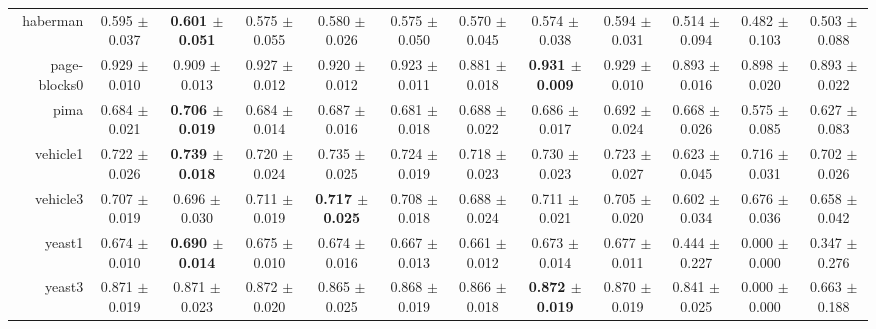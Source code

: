 \begin{table}[!ht]
{\begin{tabular}{r c c c c c c c c c c c}
haberman & 0.595 $\pm$ 0.037 & \textbf{0.601 $\pm$ 0.051} & 0.575 $\pm$ 0.055 & 0.580 $\pm$ 0.026 & 0.575 $\pm$ 0.050 & 0.570 $\pm$ 0.045 & 0.574 $\pm$ 0.038 & 0.594 $\pm$ 0.031 & 0.514 $\pm$ 0.094 & 0.482 $\pm$ 0.103 & 0.503 $\pm$ 0.088 \\
page-blocks0 & 0.929 $\pm$ 0.010 & 0.909 $\pm$ 0.013 & 0.927 $\pm$ 0.012 & 0.920 $\pm$ 0.012 & 0.923 $\pm$ 0.011 & 0.881 $\pm$ 0.018 & \textbf{0.931 $\pm$ 0.009} & 0.929 $\pm$ 0.010 & 0.893 $\pm$ 0.016 & 0.898 $\pm$ 0.020 & 0.893 $\pm$ 0.022 \\
pima & 0.684 $\pm$ 0.021 & \textbf{0.706 $\pm$ 0.019} & 0.684 $\pm$ 0.014 & 0.687 $\pm$ 0.016 & 0.681 $\pm$ 0.018 & 0.688 $\pm$ 0.022 & 0.686 $\pm$ 0.017 & 0.692 $\pm$ 0.024 & 0.668 $\pm$ 0.026 & 0.575 $\pm$ 0.085 & 0.627 $\pm$ 0.083 \\
vehicle1 & 0.722 $\pm$ 0.026 & \textbf{0.739 $\pm$ 0.018} & 0.720 $\pm$ 0.024 & 0.735 $\pm$ 0.025 & 0.724 $\pm$ 0.019 & 0.718 $\pm$ 0.023 & 0.730 $\pm$ 0.023 & 0.723 $\pm$ 0.027 & 0.623 $\pm$ 0.045 & 0.716 $\pm$ 0.031 & 0.702 $\pm$ 0.026 \\
vehicle3 & 0.707 $\pm$ 0.019 & 0.696 $\pm$ 0.030 & 0.711 $\pm$ 0.019 & \textbf{0.717 $\pm$ 0.025} & 0.708 $\pm$ 0.018 & 0.688 $\pm$ 0.024 & 0.711 $\pm$ 0.021 & 0.705 $\pm$ 0.020 & 0.602 $\pm$ 0.034 & 0.676 $\pm$ 0.036 & 0.658 $\pm$ 0.042 \\
yeast1 & 0.674 $\pm$ 0.010 & \textbf{0.690 $\pm$ 0.014} & 0.675 $\pm$ 0.010 & 0.674 $\pm$ 0.016 & 0.667 $\pm$ 0.013 & 0.661 $\pm$ 0.012 & 0.673 $\pm$ 0.014 & 0.677 $\pm$ 0.011 & 0.444 $\pm$ 0.227 & 0.000 $\pm$ 0.000 & 0.347 $\pm$ 0.276 \\
yeast3 & 0.871 $\pm$ 0.019 & 0.871 $\pm$ 0.023 & 0.872 $\pm$ 0.020 & 0.865 $\pm$ 0.025 & 0.868 $\pm$ 0.019 & 0.866 $\pm$ 0.018 & \textbf{0.872 $\pm$ 0.019} & 0.870 $\pm$ 0.019 & 0.841 $\pm$ 0.025 & 0.000 $\pm$ 0.000 & 0.663 $\pm$ 0.188 \\
\end{tabular}}
\end{table}
